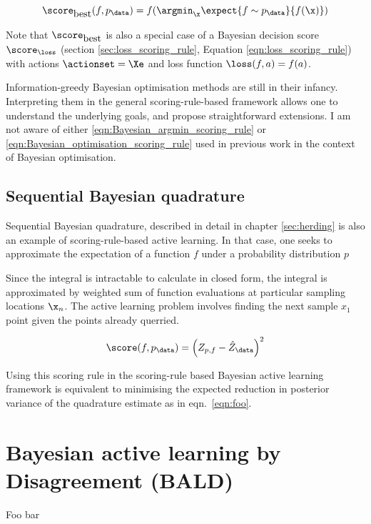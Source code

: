 \begin{equation}
	\score_{\mbox{best}}(f,p_\data) = f(\argmin_{\x}\expect{f\sim p_\data}{f(\x)}) \label{eqn:Bayesian_optimisation_scoring_rule}
\end{equation}

Note that $\score_{\mbox{best}}$ is also a special case of a Bayesian decision score $\score_{\loss}$ (section \ref{sec:loss_scoring_rule}, Equation \eqref{eqn:loss_scoring_rule}) with actions $\actionset=\Xe$ and loss function $\loss(f,a)=f(a)$.


Information-greedy Bayesian optimisation methods are still in their infancy. Interpreting them in the general scoring-rule-based framework allows one to understand the underlying goals, and propose straightforward extensions. I am not aware of either \eqref{eqn:Bayesian_argmin_scoring_rule} or \eqref{eqn:Bayesian_optimisation_scoring_rule} used in previous work in the context of Bayesian optimisation.

\subsection{Sequential Bayesian quadrature}

Sequential Bayesian quadrature, described in detail in chapter \ref{sec:herding} is also an example of scoring-rule-based active learning. In that case, one seeks to approximate the expectation of a function $f$ under a probability distribution $p$

Since the integral is intractable to calculate in closed form, the integral is approximated by weighted sum of function evaluations at particular sampling locations $\x_n$. The active learning problem involves finding the next sample $x_1$ point given the points already querried.

\begin{equation}
	\score(f,p_\data) = \left(Z_{p,f} - \hat{Z}_\data \right)^2
\end{equation}

Using this scoring rule in the scoring-rule based Bayesian active learning framework is equivalent to minimising the expected reduction in posterior variance of the quadrature estimate as in eqn.\ \eqref{eqn:foo}.

\section{Bayesian active learning by Disagreement (BALD)}

Foo bar
